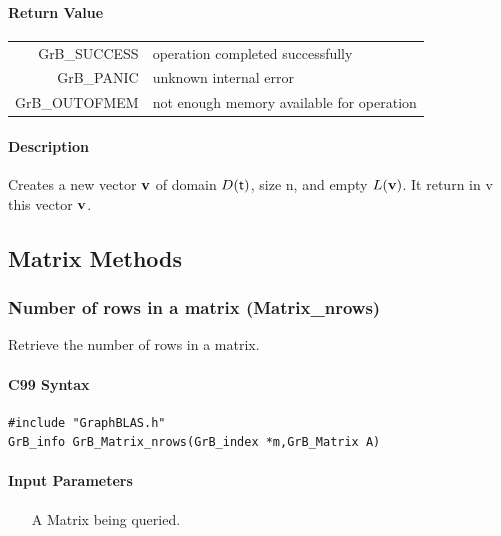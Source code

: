 \documentclass[11pt]{extarticle}
\begin{document}
\paragraph{Return Value}

\begin{tabular}{rl} 
{\sf GrB\_SUCCESS} 	& operation completed successfully \\
{\sf GrB\_PANIC}	& unknown internal error \\
{\sf GrB\_OUTOFMEM}	& not enough memory available for operation \\
\end{tabular}

\paragraph{Description}

Creates a new vector ${\bf v}$ of domain $D({\sf t})$, size {\sf n}, and
empty $L({\bf v})$. It return in {\sf v} this vector ${\bf v}$.



\subsection{Matrix Methods}

\subsubsection{Number of rows in a matrix ({\sf Matrix\_nrows})}

Retrieve the number of rows in a matrix.

\paragraph{C99 Syntax}

\begin{verbatim}
#include "GraphBLAS.h"
GrB_info GrB_Matrix_nrows(GrB_index *m,GrB_Matrix A)
\end{verbatim}

\paragraph{Input Parameters}

\begin{itemize}
	\item[{\sf A}] Matrix being queried.
\end{itemize}
\end{document}
